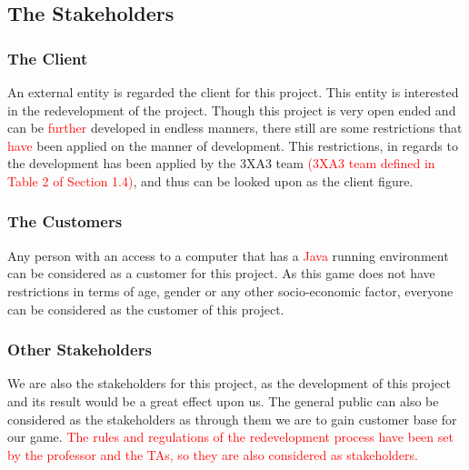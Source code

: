 \documentclass[12pt,letterpaper]{article}
\begin{document}
	
	\subsection{The Stakeholders}
	\subsubsection{The Client}
	An external entity is regarded the client for this project. This entity is interested in the redevelopment of the project. Though this project is very open ended and can be \textcolor{red}{further} developed in endless manners, there still are some restrictions that \textcolor{red}{have} been applied on the manner of development. This restrictions, in regards to the development has been applied by the 3XA3 team\textcolor{red}{ (3XA3 team defined in Table 2 of Section 1.4)}, and thus can be looked upon as the client figure.\\
			
	\subsubsection{The Customers}
	Any person with an access to a computer that has a \textcolor{red}{Java} running environment can be considered as a customer for this project. As this game does not have restrictions in terms of age, gender or any other socio-economic factor, everyone can be considered as the customer of this project.\\

	\subsubsection{Other Stakeholders}
	We are also the stakeholders for this project, as the development of this project and its result would be a great effect upon us. The general public can also be considered as the stakeholders as through them we are to gain customer base for our game. \textcolor{red}{The rules and regulations of the redevelopment process have been set by the professor and the TAs, so they are also considered as stakeholders.}
	
\end{document}
